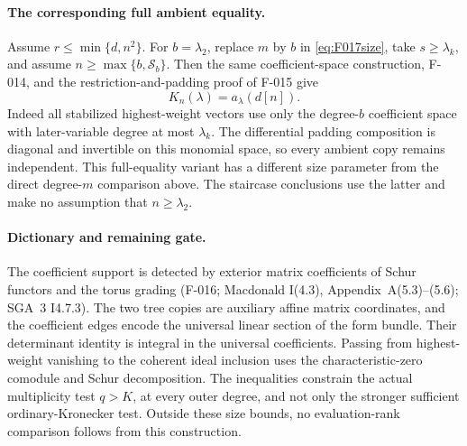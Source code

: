 \paragraph{The corresponding full ambient equality.}
Assume \(r\leq\min\{d,n^2\}\). For \(b=\lambda_2\), replace \(m\) by \(b\) in
\eqref{eq:F017size}, take \(s\geq\lambda_k\), and assume
\(n\geq\max\{b,\mathcal S_b\}\).
Then the same coefficient-space construction, F-014, and
the restriction-and-padding proof of F-015 give
\[
                         K_n(\lambda)=a_\lambda(d[n]).
\]
Indeed all stabilized highest-weight vectors use only the
degree-\(b\) coefficient space with later-variable degree
at most \(\lambda_k\). The differential padding composition
is diagonal and invertible on this monomial space, so every
ambient copy remains independent. This full-equality variant
has a different size parameter from the direct degree-\(m\)
comparison above. The staircase conclusions use the latter
and make no assumption that \(n\geq\lambda_2\).

\paragraph{Dictionary and remaining gate.}
The coefficient support is detected by exterior matrix
coefficients of Schur functors and the torus grading
(F-016; Macdonald I(4.3), Appendix~A(5.3)--(5.6);
SGA~3 I4.7.3). The two tree copies are auxiliary affine
matrix coordinates, and the coefficient edges encode the
universal linear section of the form bundle. Their determinant
identity is integral in the universal coefficients. Passing
from highest-weight vanishing to the coherent ideal inclusion
uses the characteristic-zero comodule and Schur decomposition.
The inequalities constrain the actual multiplicity test
\(q>K\), at every outer degree, and not only the stronger
sufficient ordinary-Kronecker test. Outside these size bounds,
no evaluation-rank comparison follows from this construction.
